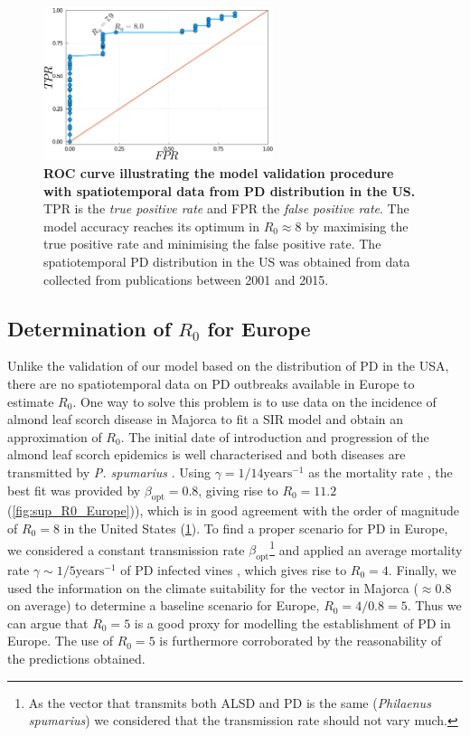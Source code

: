 \begin{figure}[H]
    \centering
    \includegraphics[width=0.6\textwidth]{Figures/ROC_curve.png}
    \caption{\textbf{ROC curve illustrating the model validation procedure
            with spatiotemporal data from PD distribution in the US.} TPR
        is
        the
        \textit{true positive rate} and FPR the \textit{false positive
            rate}.
        The model
        accuracy reaches its optimum in $R_0\approx8$ by maximising the
        true
        positive
        rate and minimising the false positive rate. The spatiotemporal PD
        distribution
        in the US was obtained from data collected from publications
        between
        2001 and
        2015.}
    \label{fig:sup_ROC} %
\end{figure}

\subsection{Determination of $R_0$ for Europe}\label{app:R0_Europe}

Unlike the validation of our model based on the distribution of PD in the
USA, there are no spatiotemporal data on PD outbreaks available in Europe to
estimate $R_0$. One way to solve this problem is to use data on the incidence
of almond leaf scorch disease in Majorca to fit a SIR model and obtain an
approximation of $R_0$. The initial date of introduction and progression of the
almond leaf scorch epidemics is well characterised and both diseases are
transmitted by \textit{P. spumarius} \cite{Moralejo2019,Moralejo2020}. Using
$\gamma=1/14 \textrm{years}^{-1}$ as the mortality rate \cite{Moralejo2020},
the best fit was provided by $\beta_{\textrm{opt}}=0.8$, giving rise to
$R_0=11.2$ (\cref{fig:sup_R0_Europe})), which is in good agreement with the
order of magnitude of $R_0=8$
in the United States (\cref{fig:sup_ROC}). To find a proper scenario for PD in
Europe, we considered a constant transmission rate
$\beta_{\textrm{opt}}$\footnote{As the vector that transmits both ALSD and PD
    is the same (\textit{Philaenus spumarius}) we considered that the
    transmission
    rate should not vary much.} and applied an average mortality rate
$\gamma\sim
    1/5 \textrm{years}^{-1}$ of PD infected vines \cite{Purcell2013}, which
gives
rise to $R_0=4$. Finally, we used the information on the climate suitability
for the vector in Majorca ($\approx0.8$ on average) to determine a baseline
scenario for Europe, $R_0=4/0.8=5$. Thus we can argue that $R_0=5$ is a good
proxy for modelling the establishment of PD in Europe. The use of $R_0=5$ is
furthermore corroborated by the reasonability of the predictions obtained.

